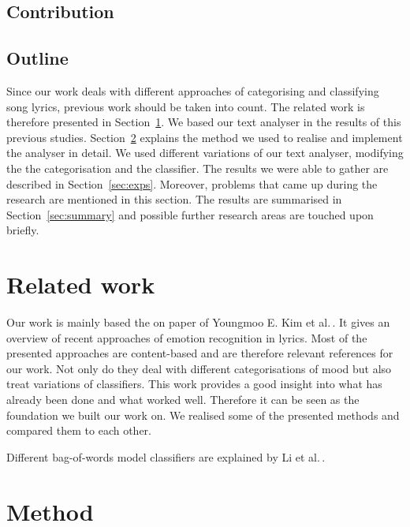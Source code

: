 \documentclass[a4paper,12pt]{article}
\begin{document}
\subsection{Contribution}


\subsection{Outline}
Since our work deals with different approaches of categorising and classifying song lyrics, previous work should be taken into count. The related work is therefore presented in Section~\ref{sec:relwork}. We based our text analyser in the results of this previous studies. Section~\ref{sec:method} explains the method we used to realise and implement the analyser in detail. We used different variations of our text analyser, modifying the the categorisation and the classifier. The results we were able to gather are described in  Section~\ref{sec:exps}. Moreover, problems that came up during the research are mentioned in this section. The results are summarised in  Section~\ref{sec:summary} and possible further research areas are touched upon briefly.

\section{Related work}
\label{sec:relwork}
Our work is mainly based the on paper of Youngmoo E. Kim et al.\,\cite{kim2010music}. It gives an overview of recent approaches of emotion recognition in lyrics.  Most of the presented approaches are content-based and are therefore relevant references for our work. Not only do they deal with different categorisations of mood but also treat variations of classifiers. This work provides a good insight into what has already been done and what worked well. Therefore it can be seen as the foundation we built our work on. We realised some of the presented methods and compared them to each other. 

Different bag-of-words model classifiers are explained by Li et al.\,\cite{li1998classification}.

\section{Method}
\label{sec:method}
\end{document}

